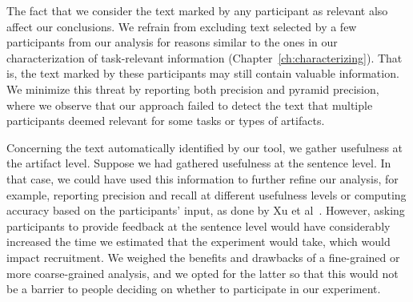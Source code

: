 The fact that we consider the text marked by any participant as relevant 
also affect our conclusions. 
We refrain from excluding text selected by a few participants from our analysis 
for reasons similar to the ones in our characterization of task-relevant information (Chapter~\ref{ch:characterizing}). That is, the text marked by these participants may still contain valuable information. 
We minimize this threat by reporting both precision and pyramid precision, where we observe that 
our approach failed to detect the text that multiple participants deemed relevant
for some tasks or types of artifacts. 



Concerning the text automatically identified by our tool, we gather usefulness at the artifact level.
Suppose we had gathered usefulness at the sentence level. In that case, we could have used this information 
to further refine our analysis, for example, reporting precision and recall 
at different usefulness levels or computing accuracy based on the participants' input, as done by Xu et al~\cite{Xu2017}. 
However, asking participants to provide feedback at the sentence level would have considerably increased the time we estimated that the experiment would take,
which would impact recruitment. We weighed the benefits and drawbacks of a fine-grained or more coarse-grained 
analysis, and we opted for the latter so that this would not be a barrier to people deciding on 
whether to participate in our experiment.